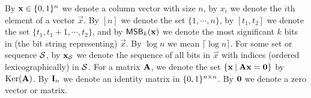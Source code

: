 By $\mathbf{x}\in\{0, 1\}^n$ we denote a column vector with size $n$,
 by $x_i$ we denote the $i$th element of a vector $\vec{x}$.
By $[n]$ we  denote the set $\{1, \cdots , n\}$, by $[t_1, t_2]$ we denote the set $\{t_1, t_1+1,\cdots ,t_2\}$, and by $\mathsf{MSB}_k(\mathbf{x})$ we denote the most significant $k$ bits in (the bit string representing) $\vec x$. By $\log n$ we mean $\lceil\log n\rceil$.
For some set or sequence $\mathcal{S}$, by $\mathbf{x}_{\mathcal{S}}$ we denote the sequence of all bits in $\vec x$ with indices (ordered lexicographically) in $\mathcal{S}$.
For a matrix $\mathbf{{A}}$, 
we denote the set $\{\mathbf{x} \: | \: \mathbf{{A}}\mathbf{x} = \mathbf{0} \}$ by $\operatorname{Ker}(\mathbf{{A}})$.  
By $\mathbf{{I}}_n$ we denote an identity matrix in $\{0, 1\}^{n\times n}$.
By $\mathbf{{0}}$ we denote a zero vector or matrix. 

